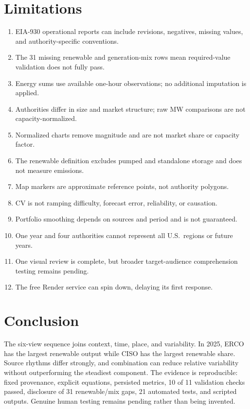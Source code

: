 \documentclass[11pt]{article}
\begin{document}
\section{Limitations}
\begin{enumerate}
  \item EIA-930 operational reports can include revisions, negatives, missing values, and authority-specific conventions.
  \item The 31 missing renewable and generation-mix rows mean required-value validation does not fully pass.
  \item Energy sums use available one-hour observations; no additional imputation is applied.
  \item Authorities differ in size and market structure; raw MW comparisons are not capacity-normalized.
  \item Normalized charts remove magnitude and are not market share or capacity factor.
  \item The renewable definition excludes pumped and standalone storage and does not measure emissions.
  \item Map markers are approximate reference points, not authority polygons.
  \item CV is not ramping difficulty, forecast error, reliability, or causation.
  \item Portfolio smoothing depends on sources and period and is not guaranteed.
  \item One year and four authorities cannot represent all U.S.\ regions or future years.
  \item One visual review is complete, but broader target-audience comprehension testing remains pending.
  \item The free Render service can spin down, delaying its first response.
\end{enumerate}

\section{Conclusion}
The six-view sequence joins context, time, place, and variability. In 2025, ERCO has the largest renewable output while CISO has the largest renewable share. Source rhythms differ strongly, and combination can reduce relative variability without outperforming the steadiest component. The evidence is reproducible: fixed provenance, explicit equations, persisted metrics, 10 of 11 validation checks passed, disclosure of 31 renewable/mix gaps, 21 automated tests, and scripted outputs. Genuine human testing remains pending rather than being invented.
\end{document}
